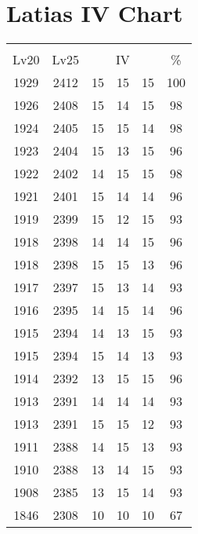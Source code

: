 \documentclass{article}%
\begin{document}
%
\normalsize%
\section{Latias IV Chart}%
\label{sec:Latias IV Chart}%
\renewcommand{\arraystretch}{1.5}%
\begin{tabular}{|c|c|c|c|c|c|}%
\hline%
\multicolumn{6}{|c|}{\textcolor{white}{ 
\linebreak{Latias}
}%
\cellcolor{black}}\\%
\multicolumn{1}{|c}{Lv20}&\multicolumn{1}{c|}{Lv25}&\multicolumn{3}{c|}{IV}&\multicolumn{1}{|c|}{\%}\\%
\hline%
\rowcolor{color100}%
1929&2412&15&15&15&100\\%
\hline%
\rowcolor{color98}%
1926&2408&15&14&15&98\\%
\hline%
\rowcolor{color98}%
1924&2405&15&15&14&98\\%
\hline%
\rowcolor{color96}%
1923&2404&15&13&15&96\\%
\hline%
\rowcolor{color98}%
1922&2402&14&15&15&98\\%
\hline%
\rowcolor{color96}%
1921&2401&15&14&14&96\\%
\hline%
\rowcolor{color93}%
1919&2399&15&12&15&93\\%
\hline%
\rowcolor{color96}%
1918&2398&14&14&15&96\\%
\hline%
\rowcolor{color96}%
1918&2398&15&15&13&96\\%
\hline%
\rowcolor{color93}%
1917&2397&15&13&14&93\\%
\hline%
\rowcolor{color96}%
1916&2395&14&15&14&96\\%
\hline%
\rowcolor{color93}%
1915&2394&14&13&15&93\\%
\hline%
\rowcolor{color93}%
1915&2394&15&14&13&93\\%
\hline%
\rowcolor{color96}%
1914&2392&13&15&15&96\\%
\hline%
\rowcolor{color93}%
1913&2391&14&14&14&93\\%
\hline%
\rowcolor{color93}%
1913&2391&15&15&12&93\\%
\hline%
\rowcolor{color93}%
1911&2388&14&15&13&93\\%
\hline%
\rowcolor{color93}%
1910&2388&13&14&15&93\\%
\hline%
\rowcolor{color93}%
1908&2385&13&15&14&93\\%
\hline%
\rowcolor{color91}%
1846&2308&10&10&10&67\\%
\end{tabular}

%
\end{document}
